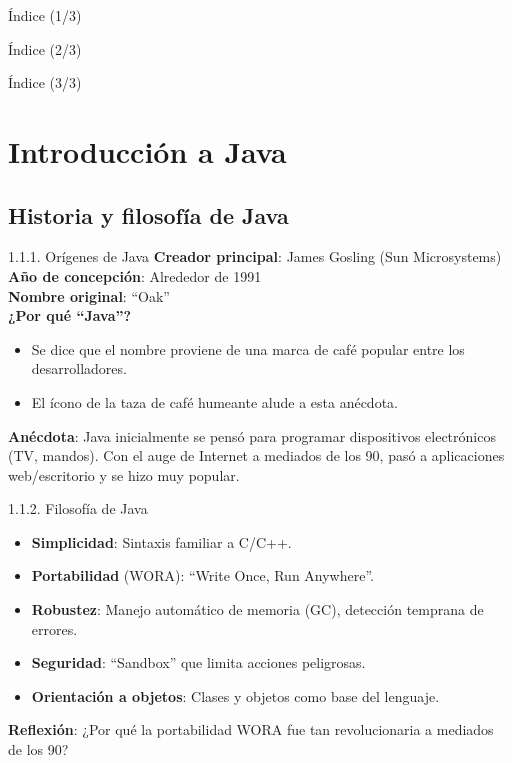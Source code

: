\documentclass{beamer}
\begin{document}
\begin{frame}{Índice (1/3)}
  \tableofcontents[sections={1-3}]
\end{frame}

\begin{frame}{Índice (2/3)}
  \tableofcontents[sections={4-5}]
\end{frame}


\begin{frame}{Índice (3/3)}
  \tableofcontents[sections={6-8}]
\end{frame}


\section{Introducción a Java}

\subsection{Historia y filosofía de Java}

\begin{frame}{1.1.1. Orígenes de Java}
\textbf{Creador principal}: James Gosling (Sun Microsystems) \\
\textbf{Año de concepción}: Alrededor de 1991 \\
\textbf{Nombre original}: “Oak” \\
\textbf{¿Por qué “Java”?} \\
\begin{itemize}
  \item Se dice que el nombre proviene de una marca de café popular entre los desarrolladores.
  \item El ícono de la taza de café humeante alude a esta anécdota.
\end{itemize}

\textbf{Anécdota}:  
Java inicialmente se pensó para programar dispositivos electrónicos (TV, mandos). Con el auge de Internet a mediados de los 90, pasó a aplicaciones web/escritorio y se hizo muy popular.
\end{frame}

\begin{frame}{1.1.2. Filosofía de Java}
\begin{itemize}
  \item \textbf{Simplicidad}: Sintaxis familiar a C/C++.
  \item \textbf{Portabilidad} (WORA): “Write Once, Run Anywhere”.
  \item \textbf{Robustez}: Manejo automático de memoria (GC), detección temprana de errores.
  \item \textbf{Seguridad}: “Sandbox” que limita acciones peligrosas.
  \item \textbf{Orientación a objetos}: Clases y objetos como base del lenguaje.
\end{itemize}

\textbf{Reflexión}:  
¿Por qué la portabilidad WORA fue tan revolucionaria a mediados de los 90?  
\end{frame}
\end{document}
